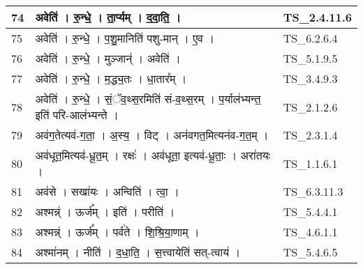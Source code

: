 \documentclass[17pt]{extarticle}
\begin{document}
\begin{longtable}{||p{0.4in}||p{4.9in}||p{0.9in}||}
    \hline
        
    74 & अवेति॑   ।   रु॒न्धे॒   ।   ता॒र्प्यम्   ।   द॒दा॒ति॒   ।    & TS\_2.4.11.6       \\
    
    \hline
        
    75 & अवेति॑   ।   रु॒न्धे॒   ।   प॒शु॒मानिति॑ पशु{-}मान्   ।   ए॒व   ।    & TS\_6.2.6.4       \\
    
    \hline
        
    76 & अवेति॑   ।   रु॒न्धे॒   ।   मुञ्जान्॑   ।   अवेति॑   ।    & TS\_5.1.9.5       \\
    
    \hline
        
    77 & अवेति॑   ।   रु॒न्धे॒   ।   म॒द्ध्य॒तः   ।   धा॒तार᳚म्   ।    & TS\_3.4.9.3       \\
    
    \hline
        
    78 & अवेति॑   ।   रु॒न्धे॒   ।   सं॒ॅव॒थ्स॒रमिति॑ सं{-}व॒थ्स॒रम्   ।   प॒र्याल॑भ्यन्त॒ इति॑ परि{-}आल॑भ्यन्ते   ।    & TS\_2.1.2.6       \\
    
    \hline
        
    79 & अव॑ग॒तेत्यव॑{-}ग॒ता॒   ।   अ॒स्य॒   ।   विट्   ।   अन॑वगत॒मित्यन॑व{-}ग॒त॒म्   ।    & TS\_2.3.1.4       \\
    
    \hline
        
    80 & अव॑धूत॒मित्यव॑{-}धू॒त॒म्   ।   रक्षः॑   ।   अव॑धूता॒ इत्यव॑{-}धू॒ताः॒   ।   अरा॑तयः   ।    & TS\_1.1.6.1       \\
    
    \hline
        
    81 & अव॑से   ।   सखा॑यः   ।   अन्विति॑   ।   त्वा॒   ।    & TS\_6.3.11.3       \\
    
    \hline
        
    82 & अश्मन्न्॑   ।   ऊर्ज᳚म्   ।   इति॑   ।   परीति॑   ।    & TS\_5.4.4.1       \\
    
    \hline
        
    83 & अश्मन्न्॑   ।   ऊर्ज᳚म्   ।   पर्व॑ते   ।   शि॒श्रि॒या॒णाम्   ।    & TS\_4.6.1.1       \\
    
    \hline
        
    84 & अश्मा॑नम्   ।   नीति॑   ।   द॒धा॒ति॒   ।   स॒त्त्वायेति॑ सत्{-}त्वाय॑   ।    & TS\_5.4.6.5       \\
    

\end{longtable}
\end{document}
